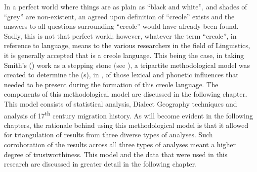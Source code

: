 In a perfect world where things are as plain as ``black and white'', and shades of  ``grey'' are non-existent, an agreed upon definition of ``creole'' exists and the answers to all questions surrounding ``creole'' would have already been found. Sadly, this is not that perfect world; however, whatever the term ``creole'', in reference to language, means to the various researchers in the field of  Linguistics, it is generally accepted that  is a creole language. This being the case, in taking Smith's (\citeyear{Smith87}) work as a stepping stone (see ), a tripartite methodological model was created to determine the (s), in , of those lexical and phonetic influences that needed to be present during the formation of this creole language. The components of this methodological model are discussed in the following chapter. This model consists of statistical analysis, Dialect Geography techniques and analysis of 17\textsuperscript{th} century  migration history. As will become evident in the following chapters, the rationale behind using this methodological model is that it allowed for triangulation of results from three diverse types of analyses. Such corroboration of the results across all three types of analyses meant a higher degree of trustworthiness. This model and the data that were used in this research are discussed in greater detail in the following chapter.
 
